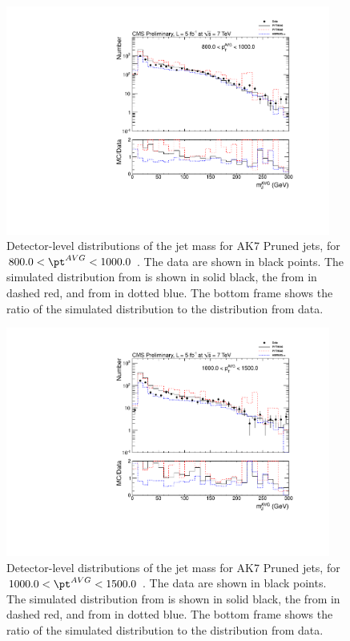 \begin{figure}[htbp]
\centering
\includegraphics[width=0.95\textwidth]{figs/histAK7MjetVsPtAvg_rawDataMCComparisons_pt_9_Pruned}
\caption{Detector-level distributions of the jet mass for AK7 Pruned jets,
for $800.0 < \pt^{AVG} < 1000.0$ \GeVc. The data are shown in black points.
The simulated distribution from \PYTHIA is shown in solid black, 
the from \PYTHIAEIGHT in dashed red, and from \HERWIG in dotted blue. 
The bottom frame shows the ratio of the simulated distribution
to the distribution from data. 
\label{figs:histAK7MjetVsPtAvg_rawDataMCComparisons_pt_9_Pruned}}
\end{figure}



\begin{figure}[htbp]
\centering
\includegraphics[width=0.95\textwidth]{figs/histAK7MjetVsPtAvg_rawDataMCComparisons_pt_10_Pruned}
\caption{Detector-level distributions of the jet mass for AK7 Pruned jets,
for $1000.0 < \pt^{AVG} < 1500.0$ \GeVc. The data are shown in black points.
The simulated distribution from \PYTHIA is shown in solid black, 
the from \PYTHIAEIGHT in dashed red, and from \HERWIG in dotted blue. 
The bottom frame shows the ratio of the simulated distribution
to the distribution from data. 
\label{figs:histAK7MjetVsPtAvg_rawDataMCComparisons_pt_10_Pruned}}
\end{figure}


\clearpage
